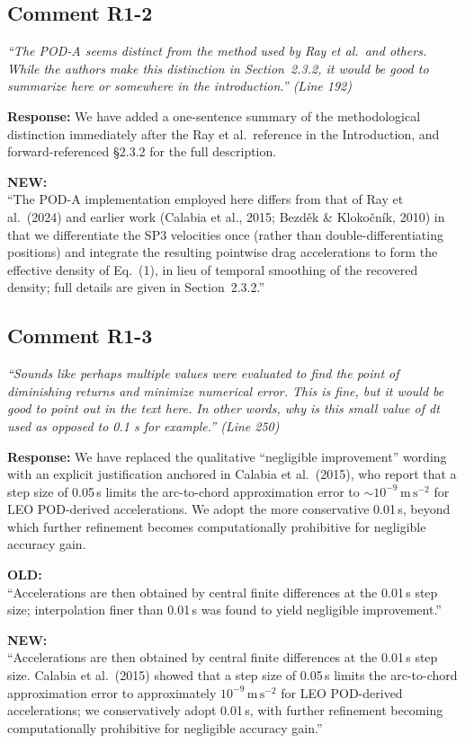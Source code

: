 \documentclass[11pt]{article}
\newcommand{\reviewercomment}[1]{%
  \medskip
  \noindent\textit{\color{reviewblue}#1}%
  \medskip
}
\newcommand{\oldtext}[1]{%
  \smallskip
  \noindent\hspace{1em}\begin{minipage}{0.92\textwidth}%
  \color{quotegray}\textbf{OLD:}\\[2pt]``#1''%
  \end{minipage}%
  \smallskip
}
\newcommand{\newtext}[1]{%
  \smallskip
  \noindent\hspace{1em}\begin{minipage}{0.92\textwidth}%
  \color{quotegreen}\textbf{NEW:}\\[2pt]``#1''%
  \end{minipage}%
  \smallskip
}
\begin{document}
\subsection{Comment R1-2}

\reviewercomment{%
``The POD-A seems distinct from the method used by Ray et al.\ and others.
While the authors make this distinction in Section~2.3.2, it would be good
to summarize here or somewhere in the introduction.'' (Line 192)}

\textbf{Response:}
We have added a one-sentence summary of the methodological distinction immediately
after the Ray et al.\ reference in the Introduction, and forward-referenced
\S2.3.2 for the full description.

\newtext{The POD-A implementation employed here differs from that of Ray et al.\ (2024) and earlier work (Calabia et al., 2015; Bezděk \& Klokočník, 2010) in that we differentiate the SP3 velocities once (rather than double-differentiating positions) and integrate the resulting pointwise drag accelerations to form the effective density of Eq.~(1), in lieu of temporal smoothing of the recovered density; full details are given in Section~2.3.2.}


\subsection{Comment R1-3}

\reviewercomment{%
``Sounds like perhaps multiple values were evaluated to find the point of
diminishing returns and minimize numerical error. This is fine, but it would
be good to point out in the text here. In other words, why is this small
value of dt used as opposed to 0.1 s for example.'' (Line 250)}

\textbf{Response:}
We have replaced the qualitative ``negligible improvement'' wording with an
explicit justification anchored in Calabia et al.\ (2015), who report that
a step size of 0.05\,s limits the arc-to-chord approximation error to
$\sim 10^{-9}\,\mathrm{m\,s^{-2}}$ for LEO POD-derived accelerations. We
adopt the more conservative 0.01\,s, beyond which further refinement
becomes computationally prohibitive for negligible accuracy gain.

\oldtext{Accelerations are then obtained by central finite differences at the 0.01\,s step size; interpolation finer than 0.01\,s was found to yield negligible improvement.}

\newtext{Accelerations are then obtained by central finite differences at the 0.01\,s step size. Calabia et al.\ (2015) showed that a step size of 0.05\,s limits the arc-to-chord approximation error to approximately $10^{-9}\,\mathrm{m\,s^{-2}}$ for LEO POD-derived accelerations; we conservatively adopt 0.01\,s, with further refinement becoming computationally prohibitive for negligible accuracy gain.}
\end{document}
